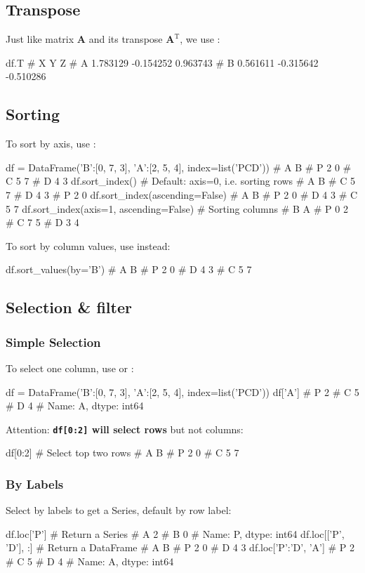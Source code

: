 \documentclass{report}
\newcommand{\Emph}[1]{\textcolor{cyan!80!white}{{\bfseries #1}}}
\begin{document}
\subsection{Transpose}
Just like matrix $\boldsymbol{A}$ and its transpose $\boldsymbol{A}^{\mathrm{T}}$, we use : 
\begin{py}
df.T
#           X         Y         Z
# A  1.783129 -0.154252  0.963743
# B  0.561611 -0.315642 -0.510286
\end{py}

\subsection{Sorting}
To sort by axis, use :
\begin{py}
df = DataFrame({'B':[0, 7, 3], 'A':[2, 5, 4]}, index=list('PCD'))
#    A  B
# P  2  0
# C  5  7
# D  4  3
df.sort_index()  # Default: axis=0, i.e. sorting rows
#    A  B
# C  5  7
# D  4  3
# P  2  0
df.sort_index(ascending=False)
#    A  B
# P  2  0
# D  4  3
# C  5  7
df.sort_index(axis=1, ascending=False) # Sorting columns
#    B  A
# P  0  2
# C  7  5
# D  3  4
\end{py}

To sort by column values, use  instead:
\begin{py}
df.sort_values(by='B')
#    A  B
# P  2  0
# D  4  3
# C  5  7
\end{py}

\subsection{Selection \& filter}
\subsubsection{Simple Selection}
To select one column, use  or : 
\begin{py}
df = DataFrame({'B':[0, 7, 3], 'A':[2, 5, 4]}, index=list('PCD'))
df['A']
# P    2
# C    5
# D    4
# Name: A, dtype: int64
\end{py}

Attention: \Emph{\texttt{df[0:2]} will select rows} but not columns:
\begin{py}
df[0:2] # Select top two rows
#    A  B
# P  2  0
# C  5  7
\end{py}

\subsubsection{By Labels}
Select by labels to get a Series, default by row label:
\begin{py}
df.loc['P']  # Return a Series
# A    2
# B    0
# Name: P, dtype: int64
df.loc[['P', 'D'], :]  # Return a DataFrame
#    A  B
# P  2  0
# D  4  3
df.loc['P':'D', 'A']
# P    2
# C    5
# D    4
# Name: A, dtype: int64
\end{py}
\end{document}
